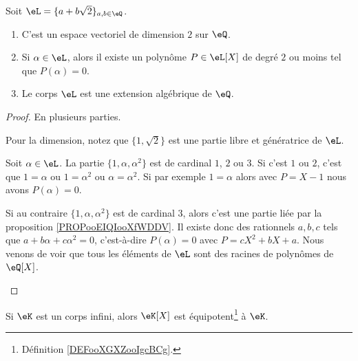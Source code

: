\begin{proposition}
	Soit \( \eL=\{ a+b\sqrt{ 2 } \}_{a,b\in \eQ}\).
	\begin{enumerate}
		\item   \label{ITEMooOMDMooLNhlyh}
		      C'est un espace vectoriel de dimension \( 2\) sur \( \eQ\).
		\item       \label{ITEMooWGGDooSbsesf}
		      Si \( \alpha\in \eL\), alors il existe un polynôme \( P\in \eL[X]\) de degré \( 2\) ou moins tel que \( P(\alpha)=0\).
		\item   \label{ITEMooPNNYooPtKYwQ}
		      Le corps \( \eL\) est une extension algébrique de \( \eQ\).
	\end{enumerate}
\end{proposition}

\begin{proof}
	En plusieurs parties.
	\begin{subproof}
		\spitem[\ref{ITEMooOMDMooLNhlyh}]
		Pour la dimension, notez que \( \{ 1,\sqrt{ 2 } \}\) est une partie libre et génératrice de \( \eL\).

		\spitem[\ref{ITEMooWGGDooSbsesf}]

		Soit \( \alpha\in \eL\). La partie \( \{ 1,\alpha,\alpha^2 \}\) est de cardinal \( 1\), \( 2\) ou \( 3\). Si c'est \( 1\) ou \( 2\), c'est que \( 1=\alpha\) ou \( 1=\alpha^2\) ou \( \alpha=\alpha^2\). Si par exemple \( 1=\alpha\) alors avec \( P=X-1\) nous avons \( P(\alpha)=0\).

		Si au contraire \( \{ 1,\alpha,\alpha^2 \}\) est de cardinal \( 3\), alors c'est une partie liée par la proposition \ref{PROPooEIQIooXfWDDV}. Il existe donc des rationnels \( a,b,c\) tels que \( a+b\alpha+c\alpha^2=0\), c'est-à-dire \( P(\alpha)=0\) avec \( P=cX^2+bX+a\).
		\spitem[\ref{ITEMooPNNYooPtKYwQ}]
		Nous venons de voir que tous les éléments de \( \eL\) sont des racines de polynômes de \( \eQ[X]\).
	\end{subproof}
\end{proof}

\begin{lemma}       \label{LEMooHWPHooZeWqns}
	Si \( \eK\) est un corps infini, alors \( \eK[X]\) est équipotent\footnote{Définition \ref{DEFooXGXZooIgcBCg}.} à \( \eK\).
\end{lemma}

